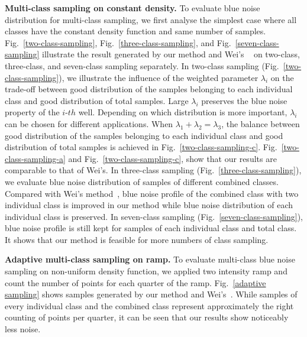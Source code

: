 \textbf{Multi-class sampling on constant density.}
To evaluate blue noise distribution for multi-class sampling,
we first analyse the simplest case where all classes have the constant density function and same number of samples.
Fig.~\ref{two-class-sampling}, Fig.~\ref{three-class-sampling},
and Fig.~\ref{seven-class-sampling} illustrate the result generated by our method and Wei's ~\cite{wei:2010:multi} on two-class, three-class, and seven-class sampling separately.
In two-class sampling (Fig.~\ref{two-class-sampling}),
we illustrate the influence of the weighted parameter $\lambda_i$ on the trade-off between good distribution of the samples belonging to each individual class and good distribution of total samples.
Large $\lambda_i$ preserves the blue noise property of the $i$-$th$ well.
Depending on which distribution is more important,
$\lambda_i$ can be chosen for different applications.
When $\lambda_1+\lambda_2=\lambda_3$,
the balance between good distribution of the samples belonging to each individual class and good distribution of total samples
is achieved in Fig.~\ref{two-class-sampling-c}.
Fig.~\ref{two-class-sampling-a} and Fig.~\ref{two-class-sampling-c},
show that our results are comparable to that of Wei's.
In three-class sampling (Fig.~\ref{three-class-sampling}),
we evaluate blue noise distribution of samples of different combined classes.
Compared with Wei's method~\cite{wei:2010:multi},
 blue noise profile of the combined class with two individual class is improved in our method
while blue noise distribution of each individual class is preserved.
In seven-class sampling (Fig.~\ref{seven-class-sampling}),
blue noise profile  is still kept for samples of each individual class and total class.
It shows that our method is feasible for more numbers of class sampling.


\textbf{Adaptive multi-class sampling on ramp.}
To evaluate multi-class blue noise sampling on non-uniform density function,
we applied two intensity ramp and count the number of points for each quarter of the ramp.
Fig.~\ref{adaptive sampling} shows samples generated by
our method and Wei's~\cite{wei:2010:multi}.
While samples of every individual class and the combined class represent approximately the right counting of points per quarter,
it can be seen that our results show noticeably less noise.

